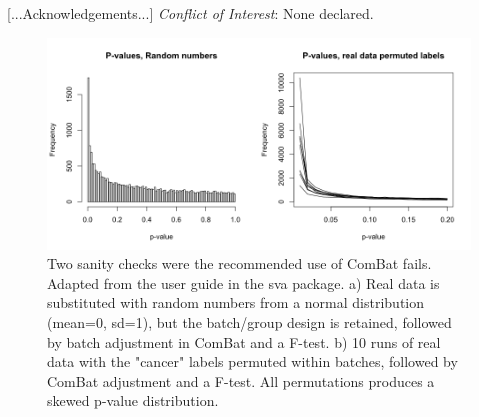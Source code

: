 \documentclass{bio}
\begin{document}
[...Acknowledgements...]
{\it Conflict of Interest}: None declared.







\begin{figure}[!p]
\centering\includegraphics[width=15cm]{Fig/pvaluesleeksva.png}
\caption{
Two sanity checks were the recommended use of ComBat fails. Adapted from the user guide in the sva package. 
a) Real data is substituted with random numbers from a normal distribution (mean=0, sd=1), but the batch/group design is retained, followed by batch adjustment in ComBat and a F-test.
b) 10 runs of real data with the "cancer" labels permuted within batches, followed by ComBat adjustment and a F-test. All permutations produces a skewed p-value distribution.
}
\label{Fig1}
\end{figure}



\end{document}
